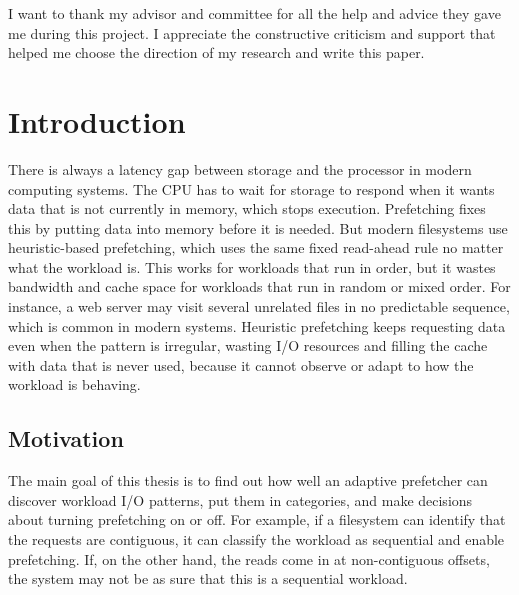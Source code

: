 \documentclass[12pt]{report}
\begin{document}
I want to thank my advisor and committee for all the help and advice they
gave me during this project. I appreciate the constructive criticism and
support that helped me choose the direction of my research and write this
paper.

\newpage

\setcounter{page}{1}

\chapter{Introduction}
\label{ch:introduction}

There is always a latency gap between storage and the processor in modern
computing systems. The CPU has to wait for storage to respond when it wants
data that is not currently in memory, which stops execution. Prefetching
fixes this by putting data into memory before it is needed. But modern
filesystems use heuristic-based prefetching, which uses the same fixed
read-ahead rule no matter what the workload is. This works for workloads
that run in order, but it wastes bandwidth and cache space for workloads
that run in random or mixed order. For instance, a web server may visit
several unrelated files in no predictable sequence, which is common in
modern systems. Heuristic prefetching keeps requesting data even when the
pattern is irregular, wasting I/O resources and filling the cache with data
that is never used, because it cannot observe or adapt to how the workload
is behaving.

\section{Motivation}

The main goal of this thesis is to find out how well an adaptive prefetcher
can discover workload I/O patterns, put them in categories, and make
decisions about turning prefetching on or off. For example, if a filesystem
can identify that the requests are contiguous, it can classify the workload
as sequential and enable prefetching. If, on the other hand, the reads come
in at non-contiguous offsets, the system may not be as sure that this is a
sequential workload.
\end{document}
